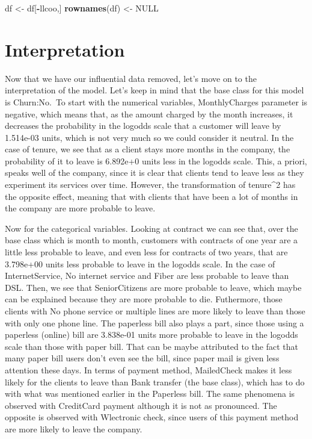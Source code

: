 \documentclass[
]{article}
\newenvironment{Shaded}{\begin{snugshade}}{\end{snugshade}}
\newcommand{\ConstantTok}[1]{\textcolor[rgb]{0.56,0.35,0.01}{#1}}
\newcommand{\FunctionTok}[1]{\textcolor[rgb]{0.13,0.29,0.53}{\textbf{#1}}}
\newcommand{\NormalTok}[1]{#1}
\newcommand{\OtherTok}[1]{\textcolor[rgb]{0.56,0.35,0.01}{#1}}
\newcommand{\SpecialCharTok}[1]{\textcolor[rgb]{0.81,0.36,0.00}{\textbf{#1}}}
\begin{document}
\begin{Shaded}
\begin{Highlighting}[]
\NormalTok{df }\OtherTok{\textless{}{-}}\NormalTok{ df[}\SpecialCharTok{{-}}\NormalTok{llcoo,]}
\FunctionTok{rownames}\NormalTok{(df) }\OtherTok{\textless{}{-}} \ConstantTok{NULL}
\end{Highlighting}
\end{Shaded}

\hypertarget{interpretation}{%
\section{Interpretation}\label{interpretation}}

Now that we have our influential data removed, let's move on to the
interpretation of the model. Let's keep in mind that the base class for
this model is Churn:No.~To start with the numerical variables,
MonthlyCharges parameter is negative, which means that, as the amount
charged by the month increases, it decreases the probability in the
logodds scale that a customer will leave by 1.514e-03 units, which is
not very much so we could consider it neutral. In the case of tenure, we
see that as a client stays more months in the company, the probability
of it to leave is 6.892e+0 units less in the logodds scale. This, a
priori, speaks well of the company, since it is clear that clients tend
to leave less as they experiment its services over time. However, the
transformation of tenure\^{}2 has the opposite effect, meaning that with
clients that have been a lot of months in the company are more probable
to leave.

Now for the categorical variables. Looking at contract we can see that,
over the base class which is month to month, customers with contracts of
one year are a little less probable to leave, and even less for
contracts of two years, that are 3.798e+00 units less probable to leave
in the logodds scale. In the case of InternetService, No internet
service and Fiber are less probable to leave than DSL. Then, we see that
SeniorCitizens are more probable to leave, which maybe can be explained
because they are more probable to die. Futhermore, those clients with No
phone service or multiple lines are more likely to leave than those with
only one phone line. The paperless bill also plays a part, since those
using a paperless (online) bill are 3.838e-01 units more probable to
leave in the logodds scale than those with paper bill. That can be maybe
attributed to the fact that many paper bill users don't even see the
bill, since paper mail is given less attention these days. In terms of
payment method, MailedCheck makes it less likely for the clients to
leave than Bank transfer (the base class), which has to do with what was
mentioned earlier in the Paperless bill. The same phenomena is observed
with CreditCard payment although it is not as pronounced. The opposite
is observed with Wlectronic check, since users of this payment method
are more likely to leave the company.
\end{document}
